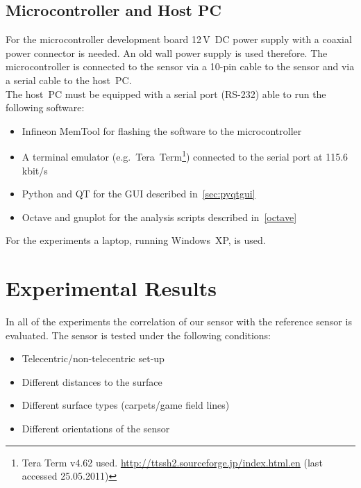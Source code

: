 \documentclass[12pt,a4paper]{article}
\begin{document}
\subsection{Microcontroller and Host PC}      

For the microcontroller development board 12\,V~DC power supply with a coaxial power connector is needed.
An old wall power supply is used therefore.
The microcontroller is connected to the sensor via a 10-pin cable to the sensor and via a serial cable to the host~PC.\\
The host~PC must be equipped with a serial port (RS-232) able to run the following software:
\begin{itemize}
 \item Infineon MemTool for flashing the software to the microcontroller
 \item A terminal emulator (e.g.\ Tera~Term\footnote{Tera Term v4.62 used. \url{http://ttssh2.sourceforge.jp/index.html.en} (last accessed 25.05.2011)}) connected to the serial port at 115.6\,kbit/s
 \item Python and QT for the GUI described in~\autoref{sec:pyqtgui}
 \item Octave and gnuplot for the analysis scripts described in~\autoref{octave}
\end{itemize}

For the experiments a laptop, running Windows~XP, is used.


\clearpage
\section{Experimental Results}
\label{exp}

In all of the experiments the correlation of our sensor with the reference sensor is evaluated.
The sensor is tested under the following conditions:

\begin{itemize}
 \item Telecentric/non-telecentric set-up
 \item Different distances to the surface
 \item Different surface types (carpets/game field lines)
 \item Different orientations of the sensor
\end{itemize}
\end{document}
